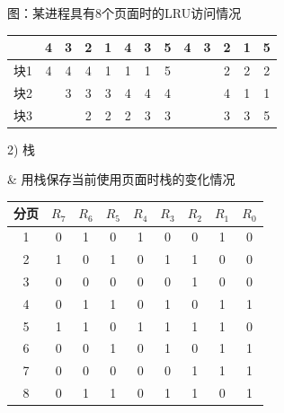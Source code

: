 \begin{frame}[fragile]{图：某进程具有8个页面时的LRU访问情况}
  \begin{center}
    \begin{tabular}{| l | c | c | c | c | c | c |c |c | c | c | c | c |}
      \hline
      \rowcolor{yellow!10}
      ~   & 4 & 3 & 2 & 1 & 4 & 3 & 5 & 4 & 3 & 2 & 1 & 5  \\
      \hline
      块1 & 4 & 4 & 4 & 1 & 1 & 1 & 5 & ~ & ~ & 2 & 2 & 2 \\ 
      块2 & ~ & 3 & 3 & 3 & 4 & 4 & 4 & ~ & ~ & 4 & 1 & 1 \\ 
      块3 & ~ & ~ & 2 & 2 & 2 & 3 & 3 & ~ & ~ & 3 & 3 & 5 \\ 
      \hline
    \end{tabular}
  \end{center}
\end{frame}

\begin{frame}[fragile]{2) 栈}
  \begin{easylist} 
    & 用栈保存当前使用页面时栈的变化情况
  \end{easylist}

  \begin{center}
    \begin{tabular}{| g | c | c | c | c | c | c | c | c |}
      \hline
      分页  & $R_7$ & $R_6$ & $R_5$ & $R_4$ & $R_3$ & $R_2$ & $R_1$ & $R_0$ \\
       & 0 & 1 & 0 & 1 & 0 & 0 & 1 & 0 \\
      2 & 1 & 0 & 1 & 0 & 1 & 1 & 0 & 0 \\
      3 & 0 & 0 & 0 & 0 & 0 & 1 & 0 & 0 \\
      4 & 0 & 1 & 1 & 0 & 1 & 0 & 1 & 1 \\
      5 & 1 & 1 & 0 & 1 & 1 & 1 & 1 & 0 \\
      6 & 0 & 0 & 1 & 0 & 1 & 0 & 1 & 1 \\
      7 & 0 & 0 & 0 & 0 & 0 & 1 & 1 & 1 \\
      8 & 0 & 1 & 1 & 0 & 1 & 1 & 0 & 1 \\
      \hline
    \end{tabular}
  \end{center}
\end{frame}


